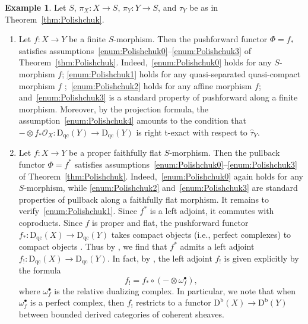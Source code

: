 \documentclass[11pt, reqno]{amsart}
\numberwithin{equation}{section}
\theoremstyle{plain}
\theoremstyle{remark}
\theoremstyle{definition}
\newtheorem{example}[theorem]{Example}
\theoremstyle{italicsname}
\newcommand{\Db}{\mathrm{D^b}}
\newcommand{\Dqc}{\mathrm{D}_{\mathrm{qc}}}
\newcommand{\cO}{\mathcal{O}}
\begin{document}
\begin{example}\label{ex:PullPushShriek}
Let $S$, $\pi_X \colon X \to S$, $\pi_Y \colon Y \to S$, and $\tau_Y$ be as in Theorem~\ref{thm:Polishchuk}. 
\begin{enumerate}[{\rm (1)}]
\item\label{enum:PullPushShriek1} Let  $f\colon X\to Y$ be a finite $S$-morphism. Then the pushforward functor $\Phi = f_*$ satisfies assumptions~\ref{enum:Polishchuk0}--\ref{enum:Polishchuk3} of Theorem~\ref{thm:Polishchuk}. 
Indeed,~\ref{enum:Polishchuk0} holds for any $S$-morphism $f$; \ref{enum:Polishchuk1} holds for any quasi-separated quasi-compact morphism $f$ \cite[\href{https://stacks.math.columbia.edu/tag/08DZ}{Tag 08DZ}]{stacks-project};~\ref{enum:Polishchuk2} holds for any affine morphism $f$; and~\ref{enum:Polishchuk3} is a standard property of pushforward along a finite morphism. 
Moreover, by the projection formula, the assumption~\ref{enum:Polishchuk4} amounts to the condition that $- \otimes f_*\cO_X \colon \Dqc(Y) \to \Dqc(Y)$ is right t-exact with respect to $\widehat{\tau}_Y$. 
\item\label{enum:PullPushShriek2} Let $f\colon X\to Y$ be a proper faithfully flat $S$-morphism. 
Then the pullback functor $\Phi = f^*$ satisfies assumptions~\ref{enum:Polishchuk0}--\ref{enum:Polishchuk3} of Theorem~\ref{thm:Polishchuk}. 
Indeed,~\ref{enum:Polishchuk0} again holds for any $S$-morphism, while \ref{enum:Polishchuk2} and~\ref{enum:Polishchuk3} are standard properties of pullback along a faithfully flat morphism. 
It remains to verify~\ref{enum:Polishchuk1}. 
Since $f^*$ is a left adjoint, it commutes with coproducts. 
Since $f$ is proper and flat, the pushforward functor $f_* \colon \Dqc(X) \to \Dqc(Y)$ takes compact objects (i.e., perfect complexes) to compact objects \cite[\href{https://stacks.math.columbia.edu/tag/0B6G}{Tag 0B6G}]{stacks-project}. 
Thus by \cite[Lemma~4.2 and Remark 4.3]{neeman-derived-cats-grothendieck-duality}, we find that $f^*$ admits a left adjoint $f_! \colon \Dqc(X) \to \Dqc(Y)$. 
In fact, by \cite[Theorem~3.3]{balmer}, the left adjoint $f_!$ is given explicitly by the formula 
\begin{equation*}
    f_{!}=f_*\circ(-\otimes\omega_f^{\bullet}),  
\end{equation*}
where $\omega_f^{\bullet}$ is the relative dualizing complex. 
In particular, we note that when $\omega_f^\bullet$ is a perfect complex, then $f_!$ restricts to a functor $\Db(X) \to \Db(Y)$ between bounded derived categories of coherent sheaves. 
\end{enumerate}
\end{example}
\end{document}
